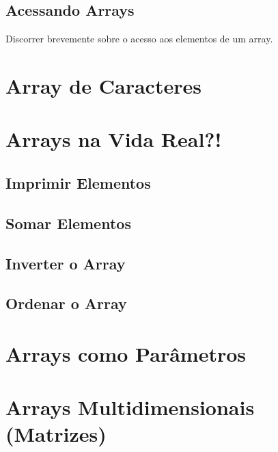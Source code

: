 \subsection{Acessando Arrays}
Discorrer brevemente sobre o acesso aos elementos de um array.

\section{Array de Caracteres}

\section{Arrays na Vida Real?!}
\subsection{Imprimir Elementos}
\subsection{Somar Elementos}
\subsection{Inverter o Array}
\subsection{Ordenar o Array}

\section{Arrays como Parâmetros}

\section{Arrays Multidimensionais (Matrizes)}



